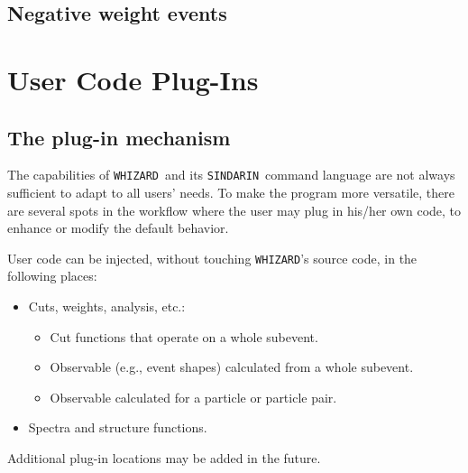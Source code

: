 \documentclass[12pt]{book}
\newcommand{\whizard}{\texttt{WHIZARD}}
\newcommand{\sindarin}{\texttt{SINDARIN}}
\begin{document}

\section{Negative weight events}

\chapter{User Code Plug-Ins}
\label{chap:user}

\section{The plug-in mechanism}

The capabilities of \whizard\ and its \sindarin\ command
language are not always sufficient to adapt to all users' needs.  To
make the program more versatile, there are several spots in the
workflow where the user may plug in his/her own code, to enhance or
modify the default behavior.

User code can be injected, without touching \whizard's source code, in
the following places:
\begin{itemize}
\item
  Cuts, weights, analysis, etc.:
  \begin{itemize}
  \item
    Cut functions that operate on a whole subevent.
  \item
    Observable (e.g., event shapes) calculated from a whole subevent.
  \item
    Observable calculated for a particle or particle pair.
  \end{itemize}
\item
  Spectra and structure functions.
\end{itemize}
Additional plug-in locations may be added in the future.
\end{document}
